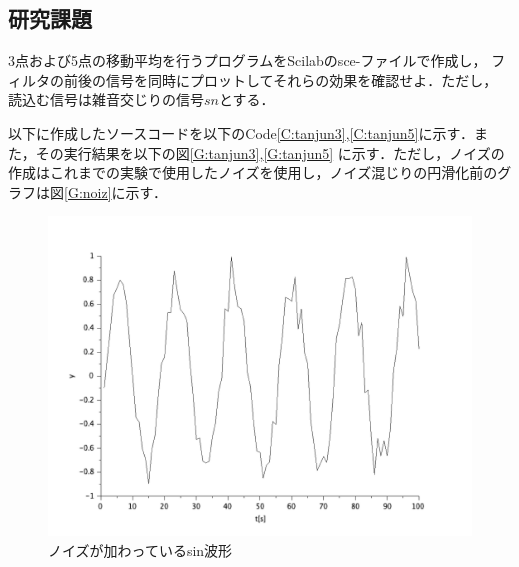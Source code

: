 \documentclass[a4paper,11pt]{jsarticle}
\begin{document}
\subsection{研究課題}
\begin{screen}
  3点および5点の移動平均を行うプログラムをScilabのsce-ファイルで作成し，
  フィルタの前後の信号を同時にプロットしてそれらの効果を確認せよ．ただし，
  読込む信号は雑音交じりの信号$sn$とする．
\end{screen}
以下に作成したソースコードを以下のCode\ref{C:tanjun3},\ref{C:tanjun5}に示す．また，その実行結果を以下の図\ref{G:tanjun3},\ref{G:tanjun5}
に示す．ただし，ノイズの作成はこれまでの実験で使用したノイズを使用し，ノイズ混じりの円滑化前のグラフは図\ref{G:noiz}に示す．


\begin{figure}[H]
  \centering
  \includegraphics[width=0.8\linewidth]{picture/noiz.png}
  \caption{ノイズが加わっているsin波形}
  \label{G:noizu}
\end{figure}
\end{document}
